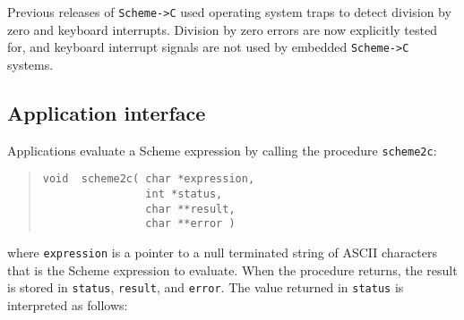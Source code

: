 \documentclass[12pt]{article}
\begin{document}
Previous releases of \texttt{Scheme->C} used operating system traps to
detect division by zero and keyboard interrupts.  Division by zero
errors are now explicitly tested for, and keyboard interrupt signals
are not used by embedded \texttt{Scheme->C} systems.

\subsection*{Application interface}

Applications evaluate a Scheme expression by calling the procedure
\texttt{scheme2c}:
\begin{quote}
\begin{verbatim}
void  scheme2c( char *expression,
                int *status,
                char **result,
                char **error )
\end{verbatim}
\end{quote}
where \texttt{expression} is a pointer to a null terminated string of ASCII
characters that is the Scheme expression to evaluate.  When the procedure
returns, the result is stored in \texttt{status}, \texttt{result}, and
\texttt{error}.  The value returned in \texttt{status} is interpreted as
follows:
\end{document}
